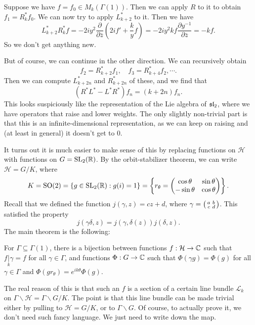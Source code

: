\documentclass[a4paper]{article}
\renewcommand{\H}{\mathcal{H}}
\begin{document}
Suppose we have $f = f_0 \in M_k(\Gamma(1))$. Then we can apply $R$ to it to obtain $f_1 = R_k^* f_0$. We can now try to apply $L_{k + 2}^*$ to it. Then we have
\[
  L_{k + 2}^* R_k^* f = -2iy^2 \frac{\partial}{\partial \bar{z}} \left(2i f' + \frac{k}{y} f \right) = -2iy^2 kf \frac{\partial y^{-1}}{\partial \bar{z}} = -kf.
\]
So we don't get anything new.

But of course, we can continue in the other direction. We can recursively obtain
\[
  f_2 = R_{k + 2}^* f_1,\quad f_3 = R_{k + 4}^* f_2, \cdots.
\]
Then we can compute $L_{k + 2n}^*$ and $R_{k + 2n}^*$ of these, and we find that
\[
  (R^* L^* - L^* R^*) f_n = (k + 2n) f_n.
\]
This looks suspiciously like the representation of the Lie algebra of $\sl_2$, where we have operators that raise and lower weights. The only slightly non-trivial part is that this is an infinite-dimensional representation, as we can keep on raising and (at least in general) it doesn't get to $0$.

It turns out it is much easier to make sense of this by replacing functions on $\H$ with functions on $G = \SL_2(\R)$. By the orbit-stabilizer theorem, we can write $\H = G/K$, where
\[
  K = \SO(2) = \{g \in \SL_2(\R) : g(i) = 1\} = \left\{
    r_\theta =
    \begin{pmatrix}
      \cos \theta & \sin \theta\\
      -\sin \theta & \cos \theta
    \end{pmatrix}
  \right\}.
\]
Recall that we defined the function $j(\gamma, z) = cz + d$, where $\gamma = \begin{psmallmatrix} a & b\\c & d\end{psmallmatrix}$. This satisfied the property
\[
  j(\gamma \delta, z) = j(\gamma, \delta(z)) j(\delta, z).
\]
The main theorem is the following:
\begin{prop}
  For $\Gamma \subseteq \Gamma(1)$, there is a bijection between functions $f: \H \to \C$ such that $f\underset{k}{|} \gamma = f$ for all $\gamma \in \Gamma$, and functions $\Phi: G \to \C$ such that $\Phi(\gamma g) = \Phi(g)$ for all $\gamma \in \Gamma$ and $\Phi(g r_\theta) = e^{ik\theta} \Phi(g)$. %
\end{prop}
The real reason of this is that such an $f$ is a section of a certain line bundle $\mathcal{L}_k$ on $\Gamma \backslash \H = \Gamma \backslash G / K$. The point is that this line bundle can be made trivial either by pulling to $\H = G/K$, or to $\Gamma \backslash G$. Of course, to actually prove it, we don't need such fancy language. We just need to write down the map.
\end{document}
